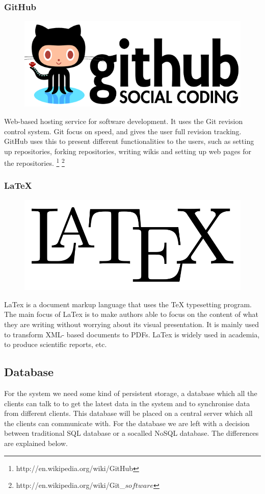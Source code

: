 \subsubsection{GitHub}

\begin{figure}
\vspace{-30pt}
\centering
\includegraphics[width = .20\textwidth]{image/github-logo.png}
\end{figure}

Web-based hosting service for software development. It uses the Git revision control system. Git focus on speed, and gives the user full revision tracking. GitHub uses this to present different functionalities to the users, such as setting up repositories, forking repositories, writing wikis and setting up web pages for the repositories.
\footnote{http://en.wikipedia.org/wiki/GitHub}
\footnote{http://en.wikipedia.org/wiki/Git\_\(software\)}

\subsubsection{LaTeX}

\begin{figure}
\vspace{-30pt}
\centering
\includegraphics[width = .20\textwidth]{image/latex-logo.png}
\end{figure}

LaTex is a document markup language that uses the TeX typesetting program. The main focus of LaTex is to make authors able to focus on the content of what they are writing without worrying about its visual presentation. It is mainly used to transform XML- based documents to PDFs. LaTex is widely used in academia, to produce scientific reports, etc.

\subsection{Database}
For the system we need some kind of persistent storage, a database which all the clients can talk to to get the latest data in the system and to synchronise data from different clients. This database will be placed on a central server which all the clients can communicate with. For the database we are left with a decision between traditional SQL database or a socalled NoSQL database. The differences are explained below.

